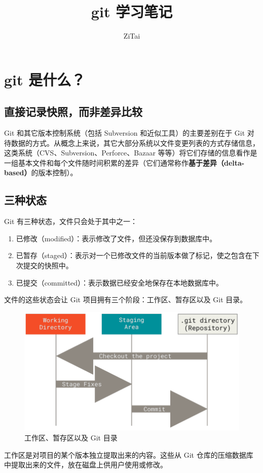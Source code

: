 \documentclass{ctexart}
\title{git 学习笔记}
\author{ZiTai}
\date{\zhdate{2023/1/04}}
\begin{document}
\maketitle
\tableofcontents
\clearpage


\section{git 是什么？}
\subsection*{直接记录快照，而非差异比较}
    Git 和其它版本控制系统（包括 Subversion 和近似工具）的主要差别在于 Git 对待数据的方式。从概念上来说，其它大部分系统以文件变更列表的方式存储信息，这类系统（CVS、Subversion、Perforce、Bazaar 等等）将它们存储的信息看作是一组基本文件和每个文件随时间积累的差异（它们通常称作\textbf{基于差异（delta-based）}的版本控制）。

\subsection*{三种状态}
    Git 有三种状态，文件只会处于其中之一：
\begin{enumerate}
    \item 已修改（modified）：表示修改了文件，但还没保存到数据库中。
    \item 已暂存（staged）：表示对一个已修改文件的当前版本做了标记，使之包含在下次提交的快照中。
    \item 已提交（committed）：表示数据已经安全地保存在本地数据库中。
\end{enumerate}

    文件的这些状态会让 Git 项目拥有三个阶段：工作区、暂存区以及 Git 目录。
\begin{figure}[htbp]
    \centering
    \includegraphics[scale = 0.5]{pictures/01.png}
    \caption{工作区、暂存区以及 Git 目录}
\end{figure}
    工作区是对项目的某个版本独立提取出来的内容。这些从 Git 仓库的压缩数据库中提取出来的文件，放在磁盘上供用户使用或修改。
\end{document}
